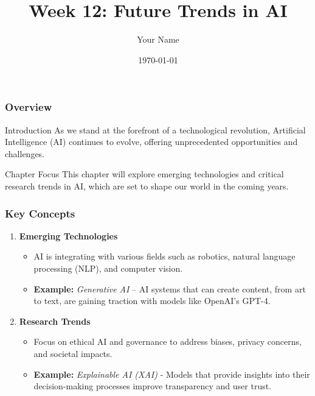 \documentclass{beamer}
\title{Week 12: Future Trends in AI}
\author{Your Name}
\institute{Your Institution}
\date{\today}
\begin{document}
\frame{\titlepage}

\begin{frame}[fragile]
    \titlepage
\end{frame}

\begin{frame}[fragile]
    \frametitle{Overview}
    \begin{block}{Introduction}
        As we stand at the forefront of a technological revolution, Artificial Intelligence (AI) continues to evolve, offering unprecedented opportunities and challenges.
    \end{block}
    \begin{block}{Chapter Focus}
        This chapter will explore emerging technologies and critical research trends in AI, which are set to shape our world in the coming years.
    \end{block}
\end{frame}

\begin{frame}[fragile]
    \frametitle{Key Concepts}
    \begin{enumerate}
        \item \textbf{Emerging Technologies}
            \begin{itemize}
                \item AI is integrating with various fields such as robotics, natural language processing (NLP), and computer vision. 
                \item \textbf{Example:} \textit{Generative AI} – AI systems that can create content, from art to text, are gaining traction with models like OpenAI's GPT-4.
            \end{itemize}
        \item \textbf{Research Trends}
            \begin{itemize}
                \item Focus on ethical AI and governance to address biases, privacy concerns, and societal impacts.
                \item \textbf{Example:} \textit{Explainable AI (XAI)} - Models that provide insights into their decision-making processes improve transparency and user trust.
            \end{itemize}
    \end{enumerate}
\end{frame}
\end{document}
